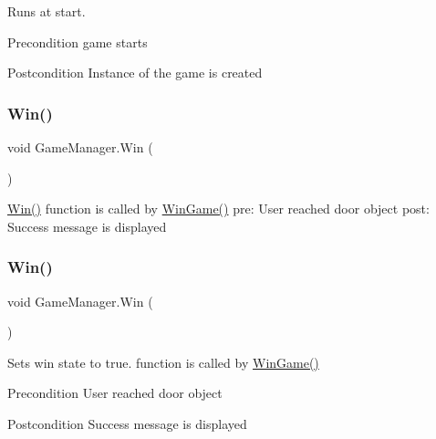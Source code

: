 Runs at start. \begin{DoxyPrecond}{Precondition}
game starts 
\end{DoxyPrecond}
\begin{DoxyPostcond}{Postcondition}
Instance of the game is created 
\end{DoxyPostcond}
\mbox{\label{class_game_manager_a76a27f36d082e328bd1c7748d8832816}} 
\subsubsection{\texorpdfstring{Win()}{Win()}\hspace{0.1cm}{\footnotesize\ttfamily [1/4]}}
{\footnotesize\ttfamily void Game\+Manager.\+Win (\begin{DoxyParamCaption}{ }\end{DoxyParamCaption})\hspace{0.3cm}{\ttfamily [inline]}}

\mbox{\hyperlink{class_game_manager_a76a27f36d082e328bd1c7748d8832816}{Win()}} function is called by \mbox{\hyperlink{class_win_game}{Win\+Game()}} pre\+: User reached door object post\+: Success message is displayed \mbox{\label{class_game_manager_a76a27f36d082e328bd1c7748d8832816}} 
\subsubsection{\texorpdfstring{Win()}{Win()}\hspace{0.1cm}{\footnotesize\ttfamily [2/4]}}
{\footnotesize\ttfamily void Game\+Manager.\+Win (\begin{DoxyParamCaption}{ }\end{DoxyParamCaption})\hspace{0.3cm}{\ttfamily [inline]}}

Sets win state to true. function is called by \mbox{\hyperlink{class_win_game}{Win\+Game()}} \begin{DoxyPrecond}{Precondition}
User reached door object 
\end{DoxyPrecond}
\begin{DoxyPostcond}{Postcondition}
Success message is displayed 
\end{DoxyPostcond}
\mbox{\label{class_game_manager_a76a27f36d082e328bd1c7748d8832816}} 
